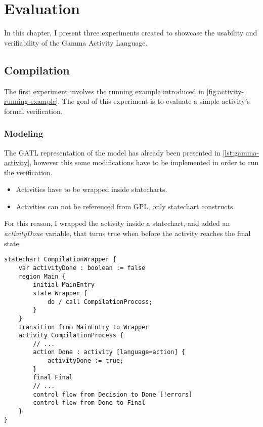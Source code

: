 \chapter{Evaluation}\label{ch:evaluation}

In this chapter, I present three experiments created to showcase the usability and verifiability of the Gamma Activity Language. 

\section{Compilation}

The first experiment involves the running example introduced in \autoref{fig:activity-running-example}. The goal of this experiment is to evaluate a simple activity's formal verification.

\subsection{Modeling}

The GATL representation of the model has already been presented in \autoref{lst:gamma-activity}, however this some modifications have to be implemented in order to run the verification.

\begin{itemize}
	\item Activities have to be wrapped inside statecharts.
	\item Activities can not be referenced from GPL, only statechart constructs.
\end{itemize}

For this reason, I wrapped the activity inside a statechart, and added an \emph{activityDone} variable, that turns true when before the activity reaches the final state. 

\begin{lstlisting}[language=statechart, linewidth=0.75\textwidth, xleftmargin=0.25\textwidth]
statechart CompilationWrapper {
	var activityDone : boolean := false
	region Main {
		initial MainEntry
		state Wrapper {
			do / call CompilationProcess;
		}
	}
	transition from MainEntry to Wrapper
	activity CompilationProcess {
		// ...
		action Done : activity [language=action] {
			activityDone := true;
		}
		final Final
		// ...
		control flow from Decision to Done [!errors]
		control flow from Done to Final
	}
}
\end{lstlisting}

